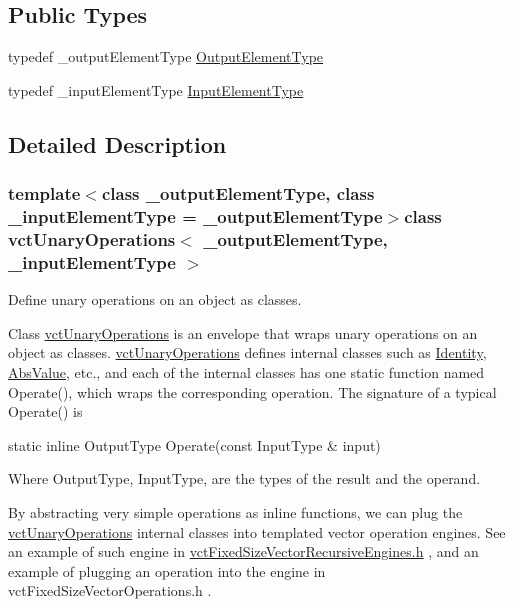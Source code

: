 \subsection*{Public Types}
\begin{DoxyCompactItemize}
\item 
typedef \-\_\-output\-Element\-Type \hyperlink{classvct_unary_operations_a42306ac3dd20d32c6d6c66ac3fa2e7b9}{Output\-Element\-Type}
\item 
typedef \-\_\-input\-Element\-Type \hyperlink{classvct_unary_operations_abf3b77bb7b8abd7ba72a6a45a65696a7}{Input\-Element\-Type}
\end{DoxyCompactItemize}


\subsection{Detailed Description}
\subsubsection*{template$<$class \-\_\-output\-Element\-Type, class \-\_\-input\-Element\-Type = \-\_\-output\-Element\-Type$>$class vct\-Unary\-Operations$<$ \-\_\-output\-Element\-Type, \-\_\-input\-Element\-Type $>$}

Define unary operations on an object as classes. 

Class \hyperlink{classvct_unary_operations}{vct\-Unary\-Operations} is an envelope that wraps unary operations on an object as classes. \hyperlink{classvct_unary_operations}{vct\-Unary\-Operations} defines internal classes such as \hyperlink{classvct_unary_operations_1_1_identity}{Identity}, \hyperlink{classvct_unary_operations_1_1_abs_value}{Abs\-Value}, etc., and each of the internal classes has one static function named Operate(), which wraps the corresponding operation. The signature of a typical Operate() is


\begin{DoxyPre} static inline OutputType Operate(const InputType & input)
\end{DoxyPre}


Where Output\-Type, Input\-Type, are the types of the result and the operand.

By abstracting very simple operations as inline functions, we can plug the \hyperlink{classvct_unary_operations}{vct\-Unary\-Operations} internal classes into templated vector operation engines. See an example of such engine in \hyperlink{vct_fixed_size_vector_recursive_engines_8h}{vct\-Fixed\-Size\-Vector\-Recursive\-Engines.\-h} , and an example of plugging an operation into the engine in vct\-Fixed\-Size\-Vector\-Operations.\-h .


